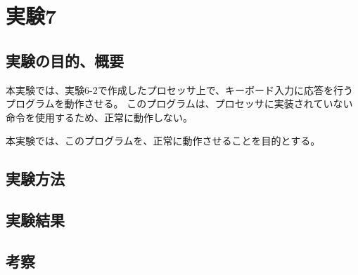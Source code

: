 \section{実験7}
\subsection{実験の目的、概要}
本実験では、実験6-2で作成したプロセッサ上で、キーボード入力に応答を行うプログラムを動作させる。
このプログラムは、プロセッサに実装されていない命令を使用するため、正常に動作しない。

本実験では、このプログラムを、正常に動作させることを目的とする。

\subsection{実験方法}

\subsection{実験結果}

\subsection{考察}
